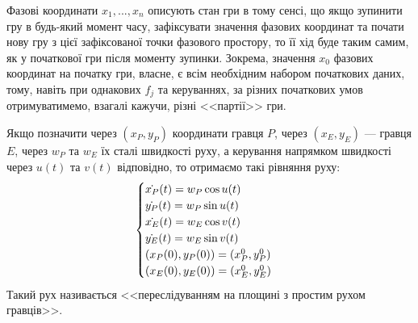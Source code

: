 Фазові координати $x_1, ..., x_n$ описують стан гри в тому сенсі, що якщо зупинити гру в будь-який момент часу, зафіксувати значення фазових координат
та почати нову гру з цієї зафіксованої точки фазового простору, то її хід буде таким самим, як у початкової гри після моменту зупинки. Зокрема,
значення $x_0$ фазових координат на початку гри, власне, є всім необхідним набором початкових даних, тому, навіть при однакових $f_j$ та керуваннях,
за різних початкових умов отримуватимемо, взагалі кажучи, різні <<партії>> гри.
\begin{example}
    Якщо позначити через $(x_P, y_P)$ координати гравця $P$, через $(x_E, y_E)$ --- гравця $E$, через $w_P$ та $w_E$ їх сталі швидкості руху, 
    а керування напрямком швидкості через $u(t)$ та $v(t)$ відповідно, то отримаємо такі рівняння руху:
    \begin{gather*}
        \begin{cases}
            \dot{x_P}(t) = w_P \cos u(t) \\
            \dot{y_P}(t) = w_P \sin u(t) \\
            \dot{x_E}(t) = w_E \cos v(t) \\
            \dot{y_E}(t) = w_E \sin v(t) \\
            (x_P(0), y_P(0)) = (x_P^0, y_P^0) \\
            (x_E(0), y_E(0)) = (x_E^0, y_E^0)
        \end{cases}
    \end{gather*}    
    Такий рух називається <<переслідуванням на площині з простим рухом гравців>>.
\end{example}
